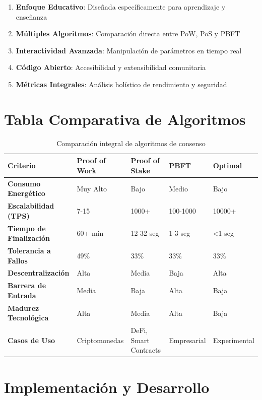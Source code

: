 \documentclass[spanish,12pt,letterpaper]{report}
\begin{document}
\begin{enumerate}
    \item \textbf{Enfoque Educativo}: Diseñada específicamente para aprendizaje y enseñanza
    \item \textbf{Múltiples Algoritmos}: Comparación directa entre PoW, PoS y PBFT
    \item \textbf{Interactividad Avanzada}: Manipulación de parámetros en tiempo real
    \item \textbf{Código Abierto}: Accesibilidad y extensibilidad comunitaria
    \item \textbf{Métricas Integrales}: Análisis holístico de rendimiento y seguridad
\end{enumerate}

\section{Tabla Comparativa de Algoritmos}

\begin{table}[ht]
\centering
\scriptsize
\begin{tabular}{|p{2.5cm}|p{3cm}|p{3cm}|p{3cm}|p{2cm}|}
\hline
\textbf{Criterio} & \textbf{Proof of Work} & \textbf{Proof of Stake} & \textbf{PBFT} & \textbf{Optimal} \\
\hline
\textbf{Consumo Energético} & Muy Alto & Bajo & Medio & Bajo \\
\hline
\textbf{Escalabilidad (TPS)} & 7-15 & 1000+ & 100-1000 & 10000+ \\
\hline
\textbf{Tiempo de Finalización} & 60+ min & 12-32 seg & 1-3 seg & <1 seg \\
\hline
\textbf{Tolerancia a Fallos} & 49\% & 33\% & 33\% & 33\% \\
\hline
\textbf{Descentralización} & Alta & Media & Baja & Alta \\
\hline
\textbf{Barrera de Entrada} & Media & Baja & Alta & Baja \\
\hline
\textbf{Madurez Tecnológica} & Alta & Media & Alta & Baja \\
\hline
\textbf{Casos de Uso} & Criptomonedas & DeFi, Smart Contracts & Empresarial & Experimental \\
\hline
\end{tabular}
\caption{Comparación integral de algoritmos de consenso}
\label{tab:consensus-comparison}
\end{table}

\section{Implementación y Desarrollo}
\end{document}
